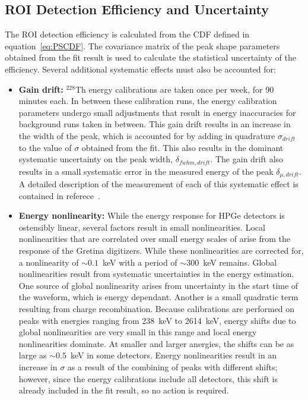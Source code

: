 \documentclass[notitlepage,rmp,aps,10pt]{revtex4-1}
\newcommand{\iso}[2]{$^{#1}$#2}
\newcommand{\Th}[1]{\iso{#1}{Th}}
\begin{document}
\subsection{ROI Detection Efficiency and Uncertainty} \label{sec:ROIEff}
The ROI detection efficiency is calculated from the CDF defined in equation~\ref{eq:PSCDF}.
The covariance matrix of the peak shape parameters obtained from the fit result is used to calculate the statistical uncertainty of the efficiency.
Several additional systematic effects must also be accounted for:
\begin{itemize}
\item \textbf{Gain drift:} \Th{228} energy calibrations are taken once per week, for 90 minutes each.
  In between these calibration runs, the energy calibration parameters undergo small adjustments that result in energy inaccuracies for background runs taken in between.
  This gain drift results in an increase in the width of the peak, which is accounted for by adding in quadrature $\sigma_{drift}$ to the value of $\sigma$ obtained from the fit.
  This also results in the dominant systematic uncertainty on the peak width, $\delta_{fwhm,drift}$.
  The gain drift also results in a small systematic error in the measured energy of the peak $\delta_{\mu,drift}$.
  A detailed description of the measurement of each of this systematic effect is contained in referece~\cite{energysystunidoc}.  
\item \textbf{Energy nonlinearity:} While the energy response for HPGe detectors is ostensibly linear, several factors result in small nonlinearities.
  Local nonlinearities that are correlated over small energy scales of arise from the response of the Gretina digitizers.
  While these nonlinearities are corrected for, a nonlinearity of $\sim0.1$~keV with a period of $\sim300$~keV remains.
  Global nonlinearities result from systematic uncertainties in the energy estimation.
  One source of global nonlinearity arises from uncertainty in the start time of the waveform, which is energy dependant.
  Another is a small quadratic term resulting from charge recombination.
  Because calibrations are performed on peaks with energies ranging from 238~keV to 2614~keV, energy shifts due to global nonlinearities are very small in this range and local energy nonlinearities dominate.
  At smaller and larger anergies, the shifts can be as large as $\sim0.5$~keV in some detectors.
  Energy nonlinearities result in an increase in $\sigma$ as a result of the combining of peaks with different shifts; however, since the energy calibrations include all detectors, this shift is already included in the fit result, so no action is required.

\end{itemize}
\end{document}
